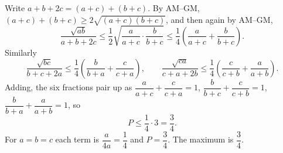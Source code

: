 Write $a+b+2c=(a+c)+(b+c)$. By AM--GM, $(a+c)+(b+c)\ge2\sqrt{(a+c)(b+c)}$, and then again by AM--GM,
\[
\dfrac{\sqrt{ab}}{a+b+2c}\le\dfrac{1}{2}\sqrt{\dfrac{a}{a+c}\cdot\dfrac{b}{b+c}}\le\dfrac{1}{4}\left(\dfrac {a}{a+c}+\dfrac {b}{b+c}\right).
\]
Similarly
\[
\dfrac{\sqrt{bc}}{b+c+2a}\le\dfrac{1}{4}\left(\dfrac {b}{b+a}+\dfrac {c}{c+a}\right),\qquad
\dfrac{\sqrt{ca}}{c+a+2b}\le\dfrac{1}{4}\left(\dfrac {c}{c+b}+\dfrac {a}{a+b}\right).
\]
Adding, the six fractions pair up as $\dfrac {a}{a+c}+\dfrac {c}{c+a}=1$, $\dfrac {b}{b+c}+\dfrac {c}{c+b}=1$, $\dfrac {b}{b+a}+\dfrac {a}{a+b}=1$, so
\[
P\le\dfrac{1}{4}\cdot3=\dfrac{3}{4} .
\]
For $a=b=c$ each term is $\dfrac{a}{4a}=\dfrac{1}{4}$ and $P=\dfrac{3}{4}$. The maximum is $\boxed{\dfrac{3}{4}}$.
